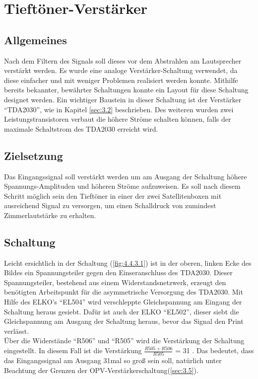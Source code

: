 \null\newpage
\section{Tieftöner-Verstärker}\label{sec:4.4}
\subsection{Allgemeines}\label{subsec:4.4.1}
Nach dem Filtern des Signals soll dieses vor dem Abstrahlen am Lautsprecher verstärkt werden. Es wurde eine analoge Verstärker-Schaltung verwendet, da diese einfacher und mit weniger Problemen realisiert werden konnte. Mithilfe bereits bekannter, bewährter Schaltungen konnte ein Layout für diese Schaltung designet werden. Ein wichtiger Baustein in dieser Schaltung ist der Verstärker \enquote{TDA2030}, wie in Kapitel \ref{sec:3.2} beschrieben.  Des weiteren wurden zwei Leistungstransistoren verbaut die höhere Ströme schalten können, falls der maximale Schaltstrom des TDA2030 erreicht wird.

\subsection{Zielsetzung}\label{subsec:4.4.2}
Das Eingangssignal soll verstärkt werden um am Ausgang der Schaltung höhere Spannungs-Amplituden und höheren Ströme aufzuweisen. Es soll nach diesem Schritt möglich sein den Tieftöner in einer der zwei Satellitenboxen mit ausreichend Signal zu versorgen, um einen Schalldruck von zumindest Zimmerlautstärke zu erhalten. 

\subsection{Schaltung}\label{subsec:4.4.3}
Leicht ersichtlich in der Schaltung (\ref{fig:4.4.3.1}) ist in der oberen, linken Ecke des Bildes ein Spannungsteiler gegen den Einseranschluss des TDA2030.
Dieser Spannungsteiler, bestehend aus einem Widerstandsnetzwerk, erzeugt den benötigten Arbeitspunkt für die asymmetrische Versorgung des TDA2030.
Mit Hilfe des ELKO's \enquote{EL504} wird verschleppte Gleichspannung am Eingang der Schaltung heraus gesiebt.
Dafür ist auch der ELKO \enquote{EL502}, dieser siebt die Gleichspannung am Ausgang der Schaltung heraus, bevor das Signal den Print verlässt. \\
Über die Widerstände \enquote{R506} und \enquote{R505} wird die Verstärkung der Schaltung eingestellt.
In diesem Fall ist die Verstärkung $\frac{R505+R506}{R505}$ = 31 .
Das bedeutet, dass das Eingangssignal am Ausgang 31mal so groß sein soll, natürlich unter Beachtung der Grenzen der OPV-Verstärkerschaltung(\ref{sec:3.5}).

